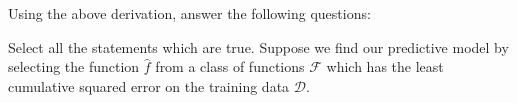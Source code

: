 Using the above derivation, answer the following questions:\newline

Select all the statements which are true. Suppose we find our predictive model by selecting the function $\hat{f}$ from a class of functions $\mathcal{F}$ which has the least cumulative squared error on the training data $\mathcal{D}$.


\begin{enumerate}
    
    

    
    
    

    
    
    

\end{enumerate}
